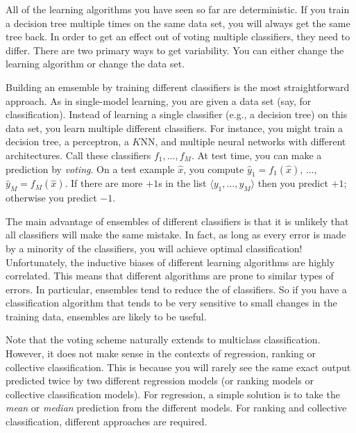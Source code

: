 All of the learning algorithms you have seen so far are
deterministic.  If you train a decision tree multiple times on the
same data set, you will always get the same tree back.  In order to
get an effect out of voting multiple classifiers, they need to
differ.  There are two primary ways to get variability.  You can
either change the learning algorithm or change the data set.

Building an emsemble by training different classifiers is the most
straightforward approach.  As in single-model learning, you are given
a data set (say, for classification).  Instead of learning a single
classifier (e.g., a decision tree) on this data set, you learn multiple
different classifiers.  For instance, you might train a decision tree,
a perceptron, a $K$NN, and multiple neural networks with different
architectures.  Call these classifiers $f_1, \dots, f_M$.  At test
time, you can make a prediction by \emph{voting}.  On a test example
$\hat x$, you compute $\hat y_1 = f_1(\hat x)$, $\dots$, $\hat y_M =
f_M(\hat x)$.  If there are more $+1$s in the list $\langle y_1,
\dots, y_M \rangle$ then you predict $+1$; otherwise you predict $-1$.

The main advantage of ensembles of different classifiers is that it is
unlikely that all classifiers will make the same mistake.  In fact, as
long as every error is made by a minority of the classifiers, you will
achieve optimal classification!  Unfortunately, the inductive biases
of different learning algorithms are highly correlated.  This means
that different algorithms are prone to similar types of errors.  In
particular, ensembles tend to reduce the  of
classifiers.  So if you have a classification algorithm that tends to
be very sensitive to small changes in the training data, ensembles are
likely to be useful.


Note that the voting scheme naturally extends to multiclass
classification.  However, it does not make sense in the contexts of
regression, ranking or collective classification.  This is because you
will rarely see the same exact output predicted twice by two different
regression models (or ranking models or collective classification
models).  For regression, a simple solution is to take the \emph{mean}
or \emph{median} prediction from the different models.  For ranking
and collective classification, different approaches are required.

